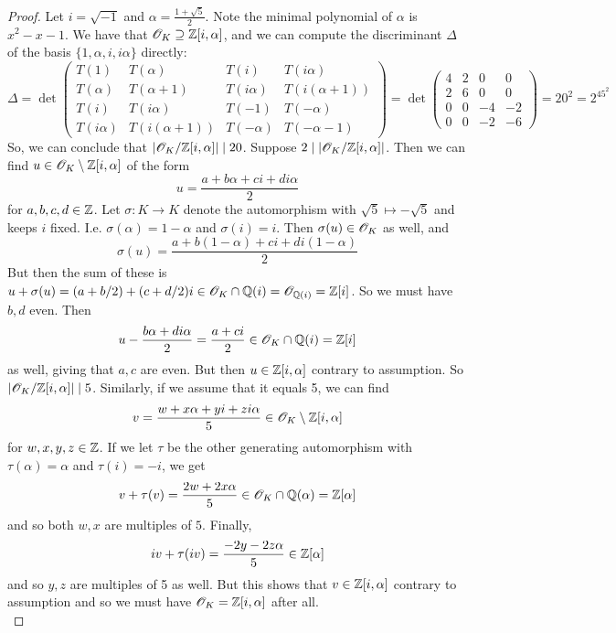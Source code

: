 \begin{proof}
	Let $i = \sqrt{-1}$ and $\alpha = \frac{1+\sqrt{5}}{2}$. Note the minimal polynomial of $\alpha$ is $x^2-x-1$. We have that $\mathscr{O}_K \supseteq \mathbb{Z}[i,\alpha]$, and we can compute the discriminant $\Delta$ of the basis $\{1,\alpha,i,i\alpha\}$ directly:
	\[ \Delta = \det\left(\begin{array}{cccc} T(1) & T(\alpha) & T(i) & T(i\alpha) \\ T(\alpha) & T(\alpha+1) & T(i\alpha) & T(i(\alpha+1)) \\ T(i) & T(i\alpha) & T(-1) & T(-\alpha) \\ T(i\alpha) & T(i(\alpha+1)) & T(-\alpha) & T(-\alpha-1) \end{array}\right) = \det\left(\begin{array}{cccc} 4 & 2 & 0 & 0 \\ 2 & 6 & 0 & 0 \\ 0 & 0 & -4 & -2 \\ 0 & 0 & -2 & -6 \end{array}\right) = 20^2 = 2^45^2 \]
	So, we can conclude that $|\mathscr{O}_K/\mathbb{Z}[i,\alpha]| \mid 20$. Suppose $2 \mid |\mathscr{O}_K/\mathbb{Z}[i,\alpha]|$. Then we can find $u \in \mathscr{O}_K \setminus \mathbb{Z}[i,\alpha]$ of the form
	\[ u = \frac{a+b\alpha+ci+di\alpha}{2} \]
	for $a,b,c,d \in \mathbb{Z}$. Let $\sigma : K \to K$ denote the automorphism with $\sqrt{5} \mapsto -\sqrt{5}$ and keeps $i$ fixed. I.e. $\sigma(\alpha) = 1-\alpha$ and $\sigma(i) = i$. Then $\sigma(u) \in \mathscr{O}_K$ as well, and
	\[ \sigma(u) = \frac{a+b(1-\alpha)+ci+di(1-\alpha)}{2} \]
	But then the sum of these is $u+\sigma(u) = (a+b/2) + (c+d/2)i \in \mathscr{O}_K \cap \mathbb{Q}(i) = \mathscr{O}_{\mathbb{Q}(i)} = \mathbb{Z}[i]$. So we must have $b,d$ even. Then
	\[ u-\frac{b\alpha+di\alpha}{2} = \frac{a+ci}{2} \in \mathscr{O}_K \cap \mathbb{Q}(i) = \mathbb{Z}[i] \]
	as well, giving that $a,c$ are even. But then $u \in \mathbb{Z}[i,\alpha]$ contrary to assumption. So $|\mathscr{O}_K/\mathbb{Z}[i,\alpha]| \mid 5$. Similarly, if we assume that it equals 5, we can find
	\[ v = \frac{w+x\alpha+yi+zi\alpha}{5} \in \mathscr{O}_K \setminus \mathbb{Z}[i,\alpha] \]
	for $w,x,y,z \in \mathbb{Z}$. If we let $\tau$ be the other generating automorphism with $\tau(\alpha) = \alpha$ and $\tau(i) = -i$, we get
	\[ v+\tau(v) = \frac{2w+2x\alpha}{5} \in \mathscr{O}_K \cap \mathbb{Q}(\alpha) = \mathbb{Z}[\alpha] \]
	and so both $w,x$ are multiples of $5$. Finally,
	\[ iv+\tau(iv) = \frac{-2y-2z\alpha}{5} \in \mathbb{Z}[\alpha] \]
	and so $y,z$ are multiples of 5 as well. But this shows that $v \in \mathbb{Z}[i,\alpha]$ contrary to assumption and so we must have $\mathscr{O}_K = \mathbb{Z}[i,\alpha]$ after all. \\
	

\end{proof}
